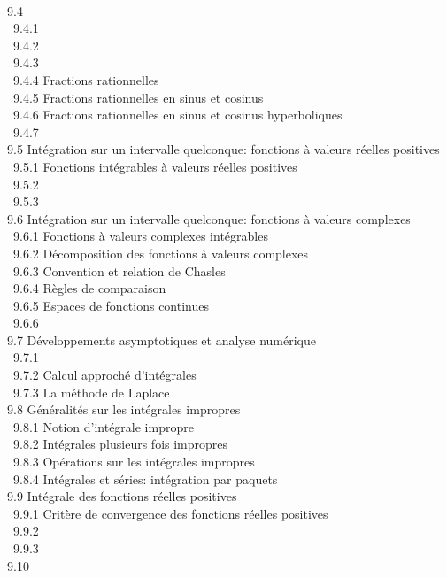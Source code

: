 \documentclass[]{article}
\begin{document}
\\ ~9.4 
\\ ~~9.4.1 
\\ ~~9.4.2 
\\ ~~9.4.3 
\\ ~~9.4.4 {Fractions
rationnelles} \\ ~~9.4.5
{Fractions rationnelles en sinus
et cosinus} \\ ~~9.4.6 {Fractions
rationnelles en sinus et cosinus hyperboliques} \\ ~~9.4.7
 \\ ~9.5
{Intégration sur un intervalle
quelconque: fonctions à valeurs réelles positives} \\ ~~9.5.1
{Fonctions intégrables à valeurs
réelles positives} \\ ~~9.5.2
 \\ ~~9.5.3
 \\ ~9.6
{Intégration sur un intervalle
quelconque: fonctions à valeurs complexes} \\ ~~9.6.1
{Fonctions à valeurs complexes
intégrables} \\ ~~9.6.2
{Décomposition des fonctions à
valeurs complexes} \\ ~~9.6.3
{Convention et relation de
Chasles} \\ ~~9.6.4 {Règles de
comparaison} \\ ~~9.6.5 {Espaces
de fonctions continues} \\ ~~9.6.6
 \\
~9.7 {Développements asymptotiques
et analyse numérique} \\ ~~9.7.1
 \\
~~9.7.2 {Calcul approché
d'intégrales} \\ ~~9.7.3 {La
méthode de Laplace} \\ ~9.8
{Généralités sur les intégrales
impropres} \\ ~~9.8.1 {Notion
d'intégrale impropre} \\ ~~9.8.2
{Intégrales plusieurs fois
impropres} \\ ~~9.8.3 {Opérations
sur les intégrales impropres} \\ ~~9.8.4
{Intégrales et séries: intégration
par paquets} \\ ~9.9 {Intégrale des
fonctions réelles positives} \\ ~~9.9.1
{Critère de convergence des
fonctions réelles positives} \\ ~~9.9.2
 \\ ~~9.9.3
 \\ ~9.10
\end{document}
